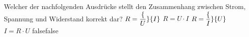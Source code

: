     {Welcher der nachfolgenden Ausdrücke stellt den Zusammenhang zwischen Strom, Spannung und Widerstand korrekt dar?}
    {$R = \dfrac\{U\}\{I\}$}
    {$R = U \cdot I$}
    {$R = \dfrac\{I\}\{U\}$}
    {$I =R \cdot U$}
    {false}{false}